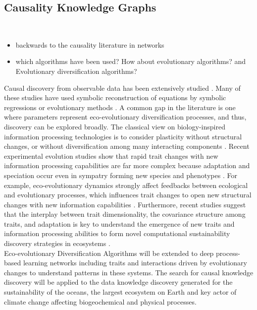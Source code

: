 \documentclass[12pt,a4paper]{article}
\begin{document}
\subsection{Causality Knowledge Graphs}
\\
\begin{itemize}
    \item backwards to the causality literature in networks
    \item which algorithms have been used? How about evolutionary algorithms? and Evolutionary diversification algorithms?
\end{itemize}

Causal discovery from observable data has been extensively studied \citep{Rackauckas2020}. Many of these studies have used symbolic reconstruction of equations by symbolic regressions or evolutionary methods \citep{Koza1992, quade2016prediction, tanevski2020combinatorial}. A common gap in the literature is one where parameters represent eco-evolutionary diversification processes, and thus, discovery can be explored broadly. The classical view on biology-inspired information processing technologies is to consider plasticity without structural changes, or without diversification among many interacting components \citep{DARWISH2018231}. Recent experimental evolution studies show that rapid trait changes with new information processing capabilities are far more complex because adaptation and speciation occur even in sympatry forming new species and phenotypes \citep{Seehausen2014}. For example, eco-evolutionary dynamics strongly affect feedbacks between ecological and evolutionary processes, which influences trait changes to open new structural changes with new information capabilities \citep{Govaertetal2019}. Furthermore, recent studies suggest that the interplay between trait dimensionality, the covariance structure among traits, and adaptation is key to understand the emergence of new traits and information processing abilities to form novel computational sustainability discovery strategies in ecosystems \cite{zora172044}.\\

Eco-evolutionary Diversification Algorithms will be extended to deep process-based learning networks including traits and interactions driven by evolutionary changes to understand patterns in these systems. The search for causal knowledge discovery will be applied to the data knowledge discovery generated for the sustainability of the oceans, the largest ecosystem on Earth and key actor of climate change affecting biogeochemical and physical processes. 
\end{document}
